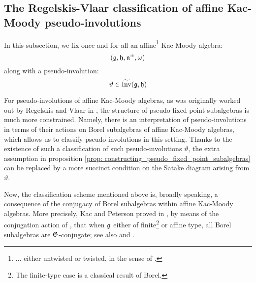     \subsection{The Regelskis-Vlaar classification of affine Kac-Moody pseudo-involutions} \label{subsection: affine_kac_moody_pseudo_involutions}
        In this subsection, we fix once and for all an affine\footnote{... either untwisted or twisted, in the sense of \cite[Chapter 8]{kac_infinite_dimensional_lie_algebras}.} Kac-Moody algebra:
            $$(\mathfrak{g}, \mathfrak{h}, \mathfrak{n}^{\pm}, \omega)$$
        along with a pseudo-involution:
            $$\vartheta \in \widetilde{\operatorname{Inv}}(\mathfrak{g}, \mathfrak{h})$$
    
        For pseudo-involutions of affine Kac-Moody algebras, as was originally worked out by Regelskis and Vlaar in \cite{regelskis_vlaar_kac_moody_pseudo_symmetric_pairs}, the structure of pseudo-fixed-point subalgebras is much more constrained. Namely, there is an interpretation of pseudo-involutions in terms of their actions on Borel subalgebras of affine Kac-Moody algebras, which allows us to classify pseudo-involutions in this setting. Thanks to the existence of such a classification of such pseudo-involutions $\vartheta$, the extra assumption in proposition \ref{prop: constructing_pseudo_fixed_point_subalgebras} can be replaced by a more succinct condition on the Satake diagram arising from $\vartheta$.

        Now, the classification scheme mentioned above is, broadly speaking, a consequence of the conjugacy of Borel subalgebras within affine Kac-Moody algebras. More precisely, Kac and Peterson proved in \cite{kac_peterson_infinite_flag_varieties_and_conjugacy_of_cartan_subalgebras}, by means of the conjugation action of , that when $\mathfrak{g}$ either of finite\footnote{The finite-type case is a classical result of Borel.} or affine type, all Borel subalgebras are $\mathfrak{G}$-conjugate; see also \cite{chernousov_egorov_gille_pianzola_cohomological_proof_of_peterson_kac_theorem} and \cite{chernousov_neher_pianzola_conjugacy_of_cartan_subalgebras_in_EALAs_with_non_fgc_centreless_cores}. 
    
